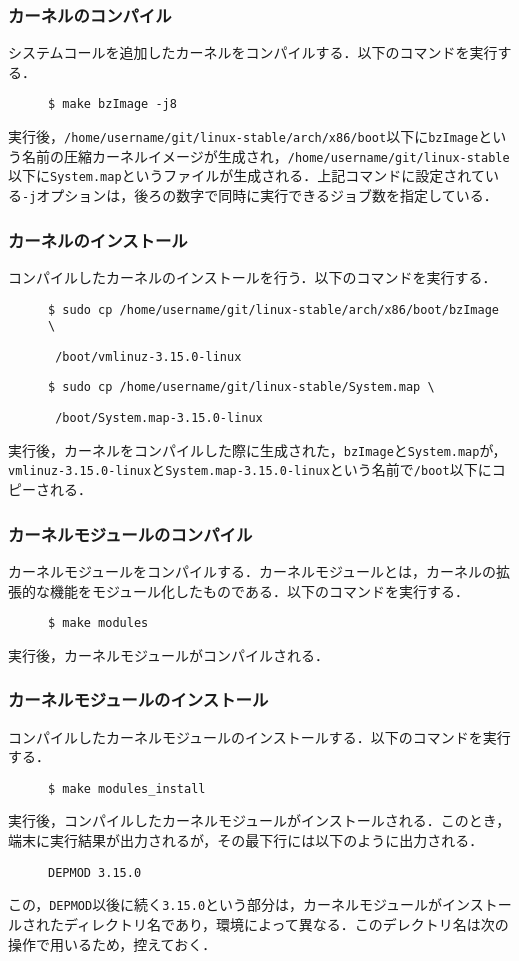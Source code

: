 \documentclass[12pt]{jsarticle}
\begin{document}
\subsubsection{カーネルのコンパイル}
システムコールを追加したカーネルをコンパイルする．以下のコマンドを実行する．
\begin{description}
\item[] \verb|$ make bzImage -j8|
\end{description}
実行後，\verb|/home/username/git/linux-stable/arch/x86/boot|以下に\verb|bzImage|という名前の圧縮カーネルイメージが生成され，\verb|/home/username/git/linux-stable|以下に\verb|System.map|というファイルが生成される．上記コマンドに設定されている\verb|-j|オプションは，後ろの数字で同時に実行できるジョブ数を指定している．
\subsubsection{カーネルのインストール}\label{kerin}
コンパイルしたカーネルのインストールを行う．以下のコマンドを実行する．
\begin{description}
\item[] \verb|$ sudo cp /home/username/git/linux-stable/arch/x86/boot/bzImage \|
\item[] \verb| /boot/vmlinuz-3.15.0-linux|
\item[] \verb|$ sudo cp /home/username/git/linux-stable/System.map \|
\item[] \verb| /boot/System.map-3.15.0-linux|
\end{description}
実行後，カーネルをコンパイルした際に生成された，\verb|bzImage|と\verb|System.map|が，\verb|vmlinuz-3.15.0-linux|と\verb|System.map-3.15.0-linux|という名前で\verb|/boot|以下にコピーされる．
\subsubsection{カーネルモジュールのコンパイル}
カーネルモジュールをコンパイルする．カーネルモジュールとは，カーネルの拡張的な機能をモジュール化したものである．以下のコマンドを実行する．
\begin{description}
\item[] \verb|$ make modules|
\end{description}
実行後，カーネルモジュールがコンパイルされる．
\subsubsection{カーネルモジュールのインストール}\label{kermin}
コンパイルしたカーネルモジュールのインストールする．以下のコマンドを実行する．
\begin{description}
\item[] \verb|$ make modules_install|
\end{description}
実行後，コンパイルしたカーネルモジュールがインストールされる．このとき，端末に実行結果が出力されるが，その最下行には以下のように出力される．
\begin{description}
\item[] \verb|DEPMOD 3.15.0|
\end{description}
この，\verb|DEPMOD|以後に続く\verb|3.15.0|という部分は，カーネルモジュールがインストールされたディレクトリ名であり，環境によって異なる．このデレクトリ名は次の操作で用いるため，控えておく．
\end{document}
